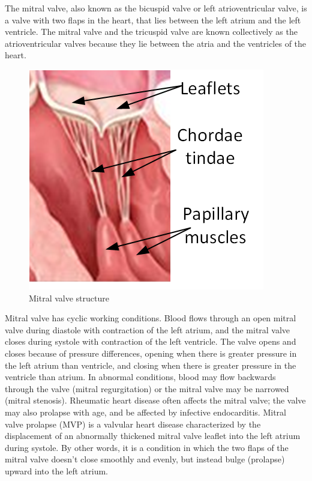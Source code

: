 The mitral valve, also known as the bicuspid valve or left atrioventricular
valve, is a valve with two flaps in the heart, that lies between the left atrium
and the left ventricle. The mitral valve and the tricuspid valve are known
collectively as the atrioventricular valves because they lie between the atria
and the ventricles of the heart.\par
\begin{figure}[H]
  \centering
  \includegraphics[width=0.4\columnwidth]{./fig/mt.png}
  \caption{Mitral valve structure}
  \label{fig:MT}
\end{figure}
Mitral valve has cyclic working conditions. Blood flows through an open mitral
valve during diastole with contraction of the left atrium, and the mitral valve
closes during systole with contraction of the left ventricle. The valve opens
and closes because of pressure differences, opening when there is greater
pressure in the left atrium than ventricle, and closing when there is greater
pressure in the ventricle than atrium. In abnormal conditions, blood may flow
backwards through the valve (mitral regurgitation) or the mitral valve may be
narrowed (mitral stenosis). Rheumatic heart disease often affects the mitral
valve; the valve may also prolapse with age, and be affected by infective
endocarditis. Mitral valve prolapse (MVP) is a valvular heart disease
characterized by the displacement of an abnormally thickened mitral valve
leaflet into the left atrium during systole. By other words, it is a condition
in which the two flaps of the mitral valve doesn't close smoothly and evenly,
but instead bulge (prolapse) upward into the left atrium.\cite{Hayek2005a}
